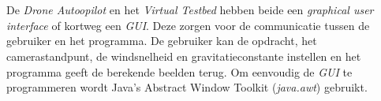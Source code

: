 \\
\\
De \textit{Drone Autoopilot} en het \textit{Virtual Testbed} hebben beide een \textit{graphical user interface} of kortweg een \textit{GUI}. Deze zorgen voor de communicatie tussen de gebruiker en het programma. De gebruiker kan de opdracht, het camerastandpunt, de windsnelheid en gravitatieconstante instellen en het programma geeft de berekende beelden terug. Om eenvoudig de \textit{GUI} te programmeren wordt Java's Abstract Window Toolkit (\textit{java.awt}) gebruikt. 

